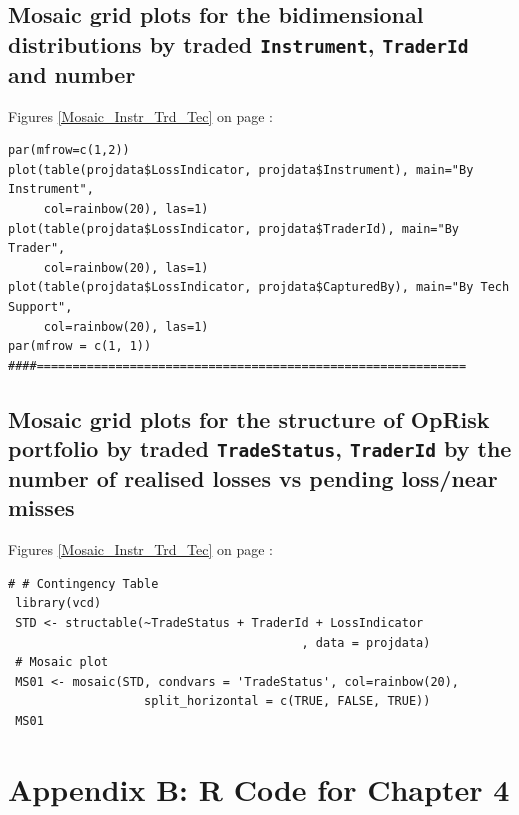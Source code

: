 \documentclass{DissertateUSU}
\begin{document}
\normalsize

\subsection{Mosaic grid plots for the bidimensional distributions by traded \texttt{Instrument}, \texttt{TraderId} and number}
\label{ssec:Mosaic bidimensional grid plot}

Figures \ref{Mosaic_Instr_Trd_Tec} on page
\pageref{Mosaic_Instr_Trd_Tec}:

\small

\begin{verbatim}
par(mfrow=c(1,2))
plot(table(projdata$LossIndicator, projdata$Instrument), main="By Instrument",
     col=rainbow(20), las=1)
plot(table(projdata$LossIndicator, projdata$TraderId), main="By Trader", 
     col=rainbow(20), las=1)
plot(table(projdata$LossIndicator, projdata$CapturedBy), main="By Tech Support",
     col=rainbow(20), las=1)
par(mfrow = c(1, 1))
####============================================================
\end{verbatim}

\normalsize

\subsection{Mosaic grid plots for the structure of OpRisk portfolio by traded \texttt{TradeStatus}, \texttt{TraderId} by the number of realised losses vs pending loss/near misses}
\label{ssec:Mosaic cross-sectional plot}

Figures \ref{Mosaic_Instr_Trd_Tec} on page
\pageref{Mosaic_Instr_Trd_Tec}:

\small

\begin{verbatim}
# # Contingency Table
 library(vcd)
 STD <- structable(~TradeStatus + TraderId + LossIndicator
                                         , data = projdata)
 # Mosaic plot
 MS01 <- mosaic(STD, condvars = 'TradeStatus', col=rainbow(20),
                   split_horizontal = c(TRUE, FALSE, TRUE))
 MS01
\end{verbatim}

\normalsize

\clearpage

\section{Appendix B: R Code for Chapter 4}
\label{sec:Appendix B: R Code for Chapter 4}
\end{document}
